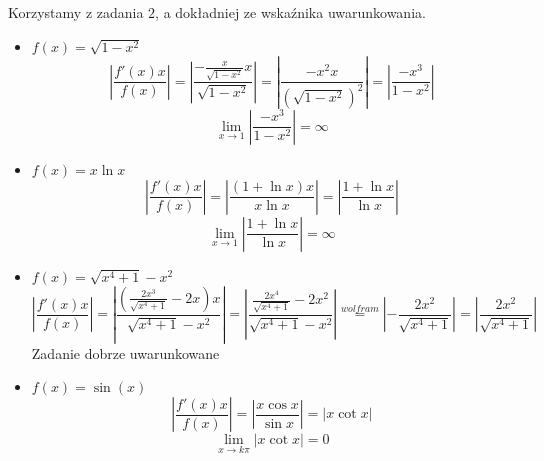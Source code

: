 \documentclass[a4paper]{article}
\newcommand{\module}[1]{\left|#1\right|}
\begin{document}
Korzystamy z zadania $2$, a dokładniej ze wskaźnika uwarunkowania.
\begin{itemize}
\item $f(x)=\sqrt{1-x^2}$
$$\module{\frac{f'(x)x}{f(x)}} = \module{\frac{-\frac{x}{\sqrt{1-x^2}} x}{\sqrt{1-x^2}}} = \module{\frac{-x^2 x}{(\sqrt{1-x^2})^2}} = \module{\frac{-x^3}{1-x^2}} $$
$$\lim_{x\rightarrow 1}\module{\frac{-x^3}{1-x^2}} = \infty$$

\item $f(x)=x\ln{x}$
$$\module{\frac{f'(x)x}{f(x)}} = \module{\frac{(1+\ln{x})x}{x\ln{x}}} = \module{\frac{1+\ln{x}}{\ln{x}}}$$
$$\lim_{x\rightarrow 1} \module{\frac{1+\ln{x}}{\ln{x}}} = \infty$$

\item $f(x) = \sqrt{x^4+1}-x^2$
$$\module{\frac{f'(x)x}{f(x)}} = \module{\frac{(\frac{2x^3}{\sqrt{x^4+1}} -2x )x}{\sqrt{x^4+1}-x^2}} = \module{\frac{\frac{2x^4}{\sqrt{x^4+1}} -2x^2 }{\sqrt{x^4+1}-x^2}} \overset{wolfram}{=} \module{-\frac{2x^2}{\sqrt{x^4+1}}} = \module{\frac{2x^2}{\sqrt{x^4+1}}}$$
Zadanie dobrze uwarunkowane

\item $f(x) =  \sin(x)$
$$\module{\frac{f'(x)x}{f(x)}} = \module{\frac{x\cos{x}}{\sin{x}}} = \module{x \cot{x}}$$
$$\lim_{x\rightarrow k\pi} \module{x \cot{x}} = 0 $$
\clearpage

\end{itemize}
\end{document}
